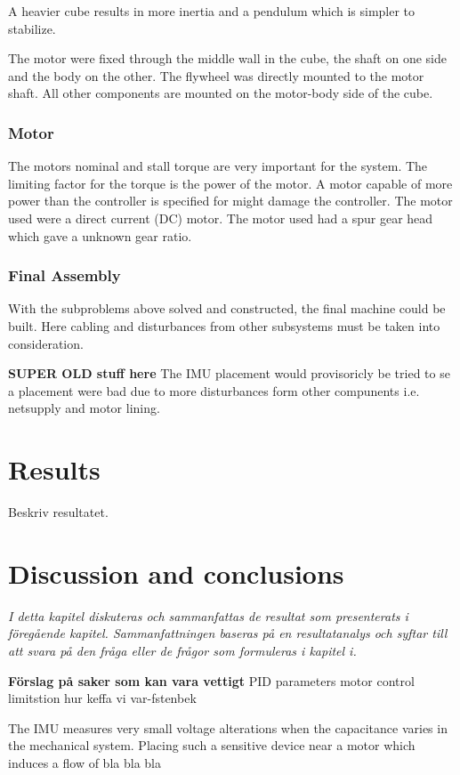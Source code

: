 \documentclass[a4paper,11pt]{kth-mag}
\begin{document}
A heavier cube results in more inertia and a pendulum which is simpler to stabilize.

The motor were fixed through the middle wall in the cube, the shaft on one side and the body on the other. The flywheel was directly mounted to the motor shaft. All other components are mounted on the motor-body side of the cube.
 
\subsection{Motor}
The motors nominal and stall torque are very important for the system. The limiting factor for the torque is the power of the motor. A motor capable of more power than the controller is specified for might damage the controller. The motor used were a direct current (DC) motor. 
The motor used had a spur gear head which gave a unknown gear ratio.

\subsection{Final Assembly}
With the subproblems above solved and constructed, the final machine could be built. Here cabling and disturbances from other subsystems must be taken into consideration. 

\textbf{SUPER OLD stuff here}
The IMU placement would provisoricly be tried to se a placement were bad due to more disturbances form other compunents i.e. netsupply and motor lining.


\chapter{Results}
Beskriv resultatet. 

\chapter{Discussion and conclusions}
\emph{I detta kapitel diskuteras och sammanfattas de resultat som presenterats i föregående kapitel. Sammanfattningen baseras på en resultatanalys och syftar till att svara på den fråga eller de frågor som formuleras i kapitel i.}

\textbf{Förslag på saker som kan vara vettigt}
PID parameters
motor control limitstion
hur keffa vi var-fstenbek

The IMU measures very small voltage alterations when the capacitance varies in the mechanical system. Placing such a sensitive device near a motor which induces a flow of bla bla bla
\end{document}

